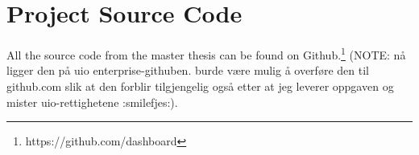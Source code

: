 







\section{Project Source Code}

All the source code from the master thesis can be found on Github.\footnote{https://github.com/dashboard} (NOTE: nå ligger den på uio enterprise-githuben. burde være mulig å overføre den til github.com slik at den forblir tilgjengelig også etter at jeg leverer oppgaven og mister uio-rettighetene :smilefjes:).